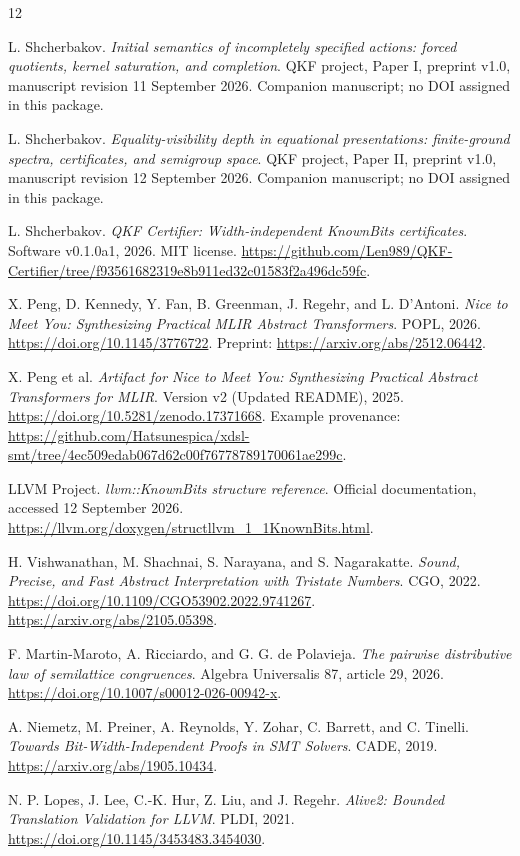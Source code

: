 \begin{thebibliography}{12}

L. Shcherbakov.
\emph{Initial semantics of incompletely specified actions: forced quotients, kernel saturation, and completion}.
QKF project, Paper I, preprint v1.0, manuscript revision 11 September 2026. Companion manuscript; no DOI assigned in this package.

L. Shcherbakov.
\emph{Equality-visibility depth in equational presentations: finite-ground spectra, certificates, and semigroup space}.
QKF project, Paper II, preprint v1.0, manuscript revision 12 September 2026. Companion manuscript; no DOI assigned in this package.

L. Shcherbakov.
\emph{QKF Certifier: Width-independent KnownBits certificates}.
Software v0.1.0a1, 2026. MIT license.
\url{https://github.com/Len989/QKF-Certifier/tree/f93561682319e8b911ed32c01583f2a496dc59fc}.

X. Peng, D. Kennedy, Y. Fan, B. Greenman, J. Regehr, and L. D'Antoni.
\emph{Nice to Meet You: Synthesizing Practical MLIR Abstract Transformers}.
POPL, 2026. \url{https://doi.org/10.1145/3776722}.
Preprint: \url{https://arxiv.org/abs/2512.06442}.

X. Peng et al.
\emph{Artifact for Nice to Meet You: Synthesizing Practical Abstract Transformers for MLIR}.
Version v2 (Updated README), 2025.
\url{https://doi.org/10.5281/zenodo.17371668}.
Example provenance: \url{https://github.com/Hatsunespica/xdsl-smt/tree/4ec509edab067d62c00f76778789170061ae299c}.

LLVM Project.
\emph{llvm::KnownBits structure reference}.
Official documentation, accessed 12 September 2026.
\url{https://llvm.org/doxygen/structllvm_1_1KnownBits.html}.

H. Vishwanathan, M. Shachnai, S. Narayana, and S. Nagarakatte.
\emph{Sound, Precise, and Fast Abstract Interpretation with Tristate Numbers}.
CGO, 2022. \url{https://doi.org/10.1109/CGO53902.2022.9741267}.
\url{https://arxiv.org/abs/2105.05398}.

F. Martin-Maroto, A. Ricciardo, and G. G. de Polavieja.
\emph{The pairwise distributive law of semilattice congruences}.
Algebra Universalis 87, article 29, 2026.
\url{https://doi.org/10.1007/s00012-026-00942-x}.

A. Niemetz, M. Preiner, A. Reynolds, Y. Zohar, C. Barrett, and C. Tinelli.
\emph{Towards Bit-Width-Independent Proofs in SMT Solvers}.
CADE, 2019. \url{https://arxiv.org/abs/1905.10434}.

N. P. Lopes, J. Lee, C.-K. Hur, Z. Liu, and J. Regehr.
\emph{Alive2: Bounded Translation Validation for LLVM}.
PLDI, 2021. \url{https://doi.org/10.1145/3453483.3454030}.

\end{thebibliography}
